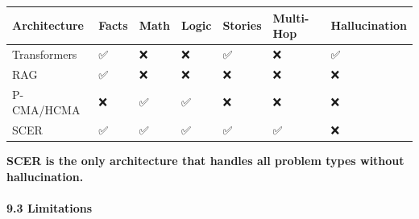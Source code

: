 \documentclass[
  11pt,
  a4paper,
]{article}
\begin{document}
\begin{longtable}[]{@{}
  >{\raggedright\arraybackslash}p{}
  >{\raggedright\arraybackslash}p{}
  >{\raggedright\arraybackslash}p{}
  >{\raggedright\arraybackslash}p{}
  >{\raggedright\arraybackslash}p{}
  >{\raggedright\arraybackslash}p{}
  >{\raggedright\arraybackslash}p{}@{}}
\toprule\noalign{}
\begin{minipage}[b]{\linewidth}\raggedright
Architecture
\end{minipage} & \begin{minipage}[b]{\linewidth}\raggedright
Facts
\end{minipage} & \begin{minipage}[b]{\linewidth}\raggedright
Math
\end{minipage} & \begin{minipage}[b]{\linewidth}\raggedright
Logic
\end{minipage} & \begin{minipage}[b]{\linewidth}\raggedright
Stories
\end{minipage} & \begin{minipage}[b]{\linewidth}\raggedright
Multi-Hop
\end{minipage} & \begin{minipage}[b]{\linewidth}\raggedright
Hallucination
\end{minipage} \\
\midrule\noalign{}
\endhead
\bottomrule\noalign{}
\endlastfoot
Transformers & ✅ & ❌ & ❌ & ✅ & ❌ & ✅ \\
RAG & ✅ & ❌ & ❌ & ❌ & ❌ & ❌ \\
P-CMA/HCMA & ❌ & ✅ & ✅ & ❌ & ❌ & ❌ \\
SCER & ✅ & ✅ & ✅ & ✅ & ✅ & ❌ \\
\end{longtable}

\textbf{SCER is the only architecture that handles all problem types
without hallucination.}

\paragraph{9.3 Limitations}\label{limitations-6}
\end{document}
